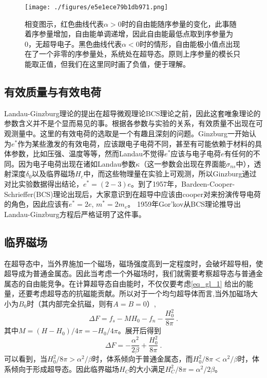 \begin{figure}[ht]
\centering
\texttt{[image: ./figures/e5e1ece79b1db971.png]}
\caption{相变图示，红色曲线代表$\alpha>0$时的自由能随序参量的变化，此事随着序参量增加，自由能单调递增，因此自由能最低点取到序参量为0，无超导电子。黑色曲线代表$\alpha<0$时的情形，自由能极小值点出现在了一个非零的序参量处，系统处在超导态。原则上序参量的模长只能取正值，但我们在这里同时画了负值，便于理解。} \label{fig_LanGin_1}
\end{figure}
\subsection{有效质量与有效电荷}
Landau-Ginzburg理论的提出在超导微观理论BCS理论之前，因此这套唯象理论的参数含义并不是个显而易见的事。根据各参数与实验的关系，有效质量不出现在可观测量中。这里的有效电荷的选取是一个有趣且深刻的问题。Ginzburg一开始认为$e^*$作为某些激发的有效电荷，应该跟电子电荷不同，甚至有可能依赖于材料的具体参数，比如压强、温度等等，然而Landau不觉得$e^*$应该与电子电荷$e$有任何的不同。因为电子电荷出现在诸如Landau参数$\kappa$（这一参数会出现在界面能$\sigma_{ns}$中），透射深度$\delta_0$以及临界磁场$H_c$中，而这些物理量在实验上可观测，所以Ginzburg通过对比实验数据得出结论，$e^* = (2-3)e$。到了1957年，Bardeen-Cooper-Schrieffer(BCS)理论出现后，大家意识到在超导中应该由cooper对来扮演传导电荷的角色，因此应该有$e^* = 2e$, $m^* = 2m_e$。 1959年Gor'kov从BCS理论推导出Landau-Ginzburg方程后严格证明了这件事。
\subsection{临界磁场}
在超导态中，当外界施加一个磁场，磁场强度高到一定程度时，会破坏超导相，使超导成为普通金属态。因此当考虑一个外磁场时，我们就需要考察超导态与普通金属态的自由能竞争。在计算超导态自由能时，不仅仅要考虑\autoref{eq_gl_1} 给出的能量，还要考虑超导态的抗磁能贡献。所以对于一个均匀超导体而言,当外加磁场大小为$B_0$时（其内部完全抗磁，则有$A=B=0$）,
\begin{equation}
\Delta F = f_s -M H_0 -f_n - \frac{H_0^2}{8\pi}~.
\end{equation}
其中$M = (H-H_0)/4\pi = -H_0/4\pi$。展开后得到
\begin{equation}
\Delta F = -\frac{\alpha^2}{2\beta} + \frac{H_0^2}{8\pi}~.
\end{equation}
可以看到，当$H_0^2/8\pi > \alpha^2/\beta$时，体系倾向于普通金属态，而$H_0^2/8\pi<\alpha^2/\beta$时，体系倾向于形成超导态。因此临界磁场$H_C$的大小满足$H_C^2/8\pi = \alpha^2/2\beta$。

